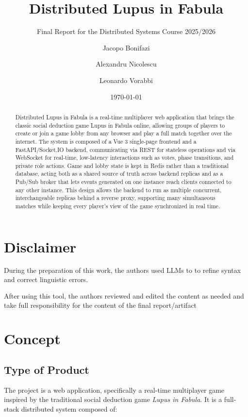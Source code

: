 \documentclass{scrartcl}
\title{\LARGE
    Distributed Lupus in Fabula
}
\subtitle{Final Report for the Distributed Systems Course 2025/2026}
\author{
    Jacopo Bonifazi \\ \emailaddr{author1@email.it}
    \and
    Alexandru Nicolescu \\ \emailaddr{author2@gmail.com}
    \and
    Leonardo Vorabbi \\ \emailaddr{leonardo.vorabbi@studio.unibo.it}
}
\date{\today}
\begin{document}
\maketitle

\begin{abstract}
  Distributed Lupus in Fabula is a real-time multiplayer web application that brings the classic social deduction game Lupus in Fabula online, allowing groups of players to create or join a game lobby from any browser and play a full match together over the internet.
  The system is composed of a Vue 3 single-page frontend and a FastAPI/Socket.IO backend, communicating via REST for stateless operations and via WebSocket for real-time, low-latency interactions such as votes, phase transitions, and private role actions. Game and lobby state is kept in Redis rather than a traditional database, acting both as a shared source of truth across backend replicas and as a Pub/Sub broker that lets events generated on one instance reach clients connected to any other instance.
  This design allows the backend to run as multiple concurrent, interchangeable replicas behind a reverse proxy, supporting many simultaneous matches while keeping every player's view of the game synchronized in real time.
\end{abstract}

\section*{Disclaimer}

During the preparation of this work, the authors used LLMs to to refine syntax and correct linguistic errors.

After using this tool, 
the authors reviewed and edited the content as needed 
and take full responsibility for the content of the final report/artifact

\section{Concept}\label{Concept}

\subsection{Type of Product}

The project is a web application, specifically a real-time multiplayer game inspired by the traditional social deduction game \textit{Lupus in Fabula}. It is a full-stack distributed system composed of:
\end{document}
